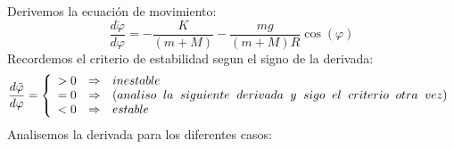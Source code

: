 \documentclass[10pt]{article}
\begin{document}
  Derivemos la ecuación de movimiento:
  \[\frac{d \ddot{\varphi}}{d \varphi} = -\frac{K}{(m+M)} - \frac{mg}{(m+M)R} \cos{(\varphi)}\]		 
 Recordemos el criterio de estabilidad segun el signo de la derivada:
 \[\frac{d \ddot{\varphi}}{d \varphi} = \left\lbrace \begin{array}{lll}
 > 0 & \Rightarrow & inestable \\
 = 0 & \Rightarrow & (analiso \hspace{0.2cm} la \hspace{0.2cm} siguiente \hspace{0.2cm} derivada \hspace{0.2cm} y \hspace{0.2cm} sigo \hspace{0.2cm} el \hspace{0.2cm} criterio \hspace{0.2cm} otra \hspace{0.2cm} vez) \\
 < 0 & \Rightarrow & estable
 \end{array}\right.\]
  Analisemos la derivada para los diferentes casos:
\end{document}

